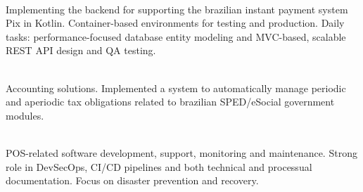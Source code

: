 \documentclass[10pt,a4paper,ragged2e]{altacv}
\begin{document}
\\

\divider

Implementing the backend for supporting the brazilian instant payment system Pix in Kotlin. Container-based environments for testing and production. Daily tasks: performance-focused database entity modeling and MVC-based, scalable REST API design and QA testing. 
\\

\newline
{}
\\

\divider


Accounting solutions. Implemented a system to automatically manage periodic and aperiodic tax obligations related to brazilian SPED/eSocial government modules.
\\

\\

\divider


POS-related software development, support, monitoring and maintenance. Strong role in DevSecOps, CI/CD pipelines and both technical and processual documentation. Focus on disaster prevention and recovery.
\\

\\

\clearpage
\end{document}
